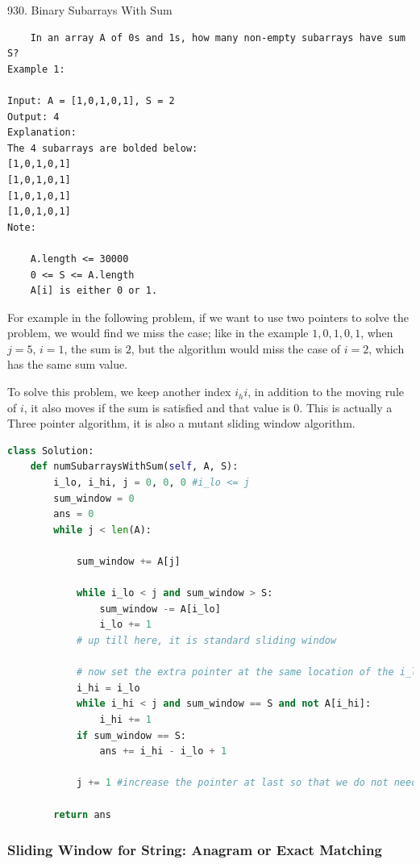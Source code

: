 \documentclass[../specific-algorithms.tex]{subfiles}
\begin{document}
930. Binary Subarrays With Sum
    \begin{lstlisting}
    In an array A of 0s and 1s, how many non-empty subarrays have sum S?
Example 1:

Input: A = [1,0,1,0,1], S = 2
Output: 4
Explanation: 
The 4 subarrays are bolded below:
[1,0,1,0,1]
[1,0,1,0,1]
[1,0,1,0,1]
[1,0,1,0,1]
Note:

    A.length <= 30000
    0 <= S <= A.length
    A[i] is either 0 or 1.
\end{lstlisting}
For example in the following problem, if we want to use two pointers to solve the problem, we would find we miss the case; like in the example $1, 0, 1, 0, 1$, when $j = 5$, $i = 1$, the sum is $2$, but the algorithm would miss the case of $i = 2$, which has the same sum value.
 
To solve this problem, we keep another index $i_hi$, in addition to the moving rule of $i$, it also moves if the sum is satisfied and that value is $0$. This is actually a Three pointer algorithm, it is also a mutant sliding window algorithm. 
\begin{lstlisting}[language=Python]
class Solution:
    def numSubarraysWithSum(self, A, S):
        i_lo, i_hi, j = 0, 0, 0 #i_lo <= j
        sum_window = 0
        ans = 0
        while j < len(A):

            sum_window += A[j]
                                     
            while i_lo < j and sum_window > S:
                sum_window -= A[i_lo]
                i_lo += 1
            # up till here, it is standard sliding window
            
            # now set the extra pointer at the same location of the i_lo
            i_hi = i_lo
            while i_hi < j and sum_window == S and not A[i_hi]:
                i_hi += 1
            if sum_window == S:
                ans += i_hi - i_lo + 1
                            
            j += 1 #increase the pointer at last so that we do not need to check if j<len again

        return ans
\end{lstlisting}

\subsubsection{Sliding Window for String: Anagram or Exact Matching}

\end{document}
